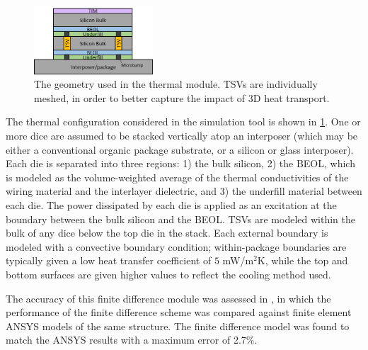 \documentclass[journal,twoside]{IEEEtran}
\newcommand{\changed}[1]{\textcolor{red}{#1}}
\renewcommand{\changed}[1]{#1} %
\begin{document}
\begin{figure}[tb]
	\centering
	\includegraphics[width=1.75in]{Figures/thermal_config_no_bc_4.png}
	\caption{
		\changed{The geometry used in the thermal module. TSVs are individually meshed, in order to better capture the impact
		of 3D heat transport.}
	}
	\label{f-thermal-config}
\end{figure}


\changed{The thermal configuration considered in the simulation tool is shown in \cref{f-thermal-config}. One or more dice are assumed
to be stacked vertically atop an interposer (which may be either a conventional organic package substrate, or a silicon or glass
interposer). Each die is separated into three regions: 1) the bulk silicon, 2) the BEOL, which is modeled as the
volume-weighted average of the thermal conductivities of the wiring material and the interlayer dielectric, and 3) the underfill material
between each die. The power dissipated by each die is applied as an excitation at the boundary between the bulk silicon and the BEOL. 
TSVs are modeled within the bulk of any dice below the top die in the stack. Each external boundary is
modeled with a convective boundary condition; within-package boundaries are typically given a low heat transfer coefficient
of $5$ mW/m$^2$K, while the top and bottom surfaces are given higher values to reflect the cooling method used.}

\changed{The accuracy of this finite difference module was assessed in \cite{zhang-thermal-2014},} in which the performance of the finite difference scheme
was compared against finite element ANSYS models of the same structure. The finite difference model was found to match the ANSYS results with a maximum
error of 2.7\%.




\end{document}
